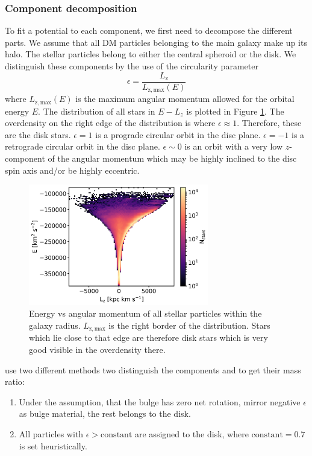\subsubsection{Component decomposition}\label{subsubsec:decomp}
To fit a potential to each component, we first need to decompose the different parts. We assume that all \ac{DM} particles belonging to the main galaxy make up its halo. The stellar particles belong to either the central spheroid or the disk. We distinguish these components by the use of the circularity parameter \citep{Abadi...circularity...2003}
\begin{equation}\label{eq:circularity}
    \epsilon = \frac{L_\mathrm{z}}{L_\mathrm{z,max}(E)}
\end{equation}
where $L_\mathrm{z,max}(E)$ is the maximum angular momentum allowed for the orbital energy $E$. The distribution of all stars in $E-L_z$ is plotted in Figure \ref{fig:e_lz_dist}. The overdensity on the right edge of the distribution is where $\epsilon \approx 1$. Therefore, these are the disk stars.
$\epsilon = 1$ is a prograde circular orbit in the disc plane. $\epsilon = -1$ is a retrograde circular orbit in the disc plane. $\epsilon \sim 0$ is an orbit with a very low $z$-component of the angular momentum which may be highly inclined to the disc spin axis and/or be highly eccentric.  
\begin{figure}
\captionsetup{format=plain}
    \centering
    \includegraphics[width = 0.7\textwidth]{plots/Auriga/decomposition_elz_snap_127.png}
    \caption{Energy vs angular momentum of all stellar particles within the galaxy radius. $L_\mathrm{z,max}$ is the right border of the distribution. Stars which lie close to that edge are therefore disk stars which is very good visible in the overdensity there.}
    \label{fig:e_lz_dist}
\end{figure}

 use two different methods two distinguish the components and to get their mass ratio:
\begin{enumerate}
\item Under the assumption, that the bulge has zero net rotation, mirror negative $\epsilon$ as bulge material, the rest belongs to the disk.
\item All particles with $\epsilon > \mathrm{constant}$ are assigned to the disk, where $\mathrm{constant} = 0.7$ is set heuristically.
\end{enumerate}

